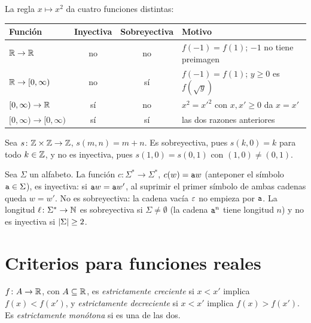 \begin{ejemplo}\label{ej:t3-cuadrado}
La regla $x\mapsto x^{2}$ da cuatro funciones distintas:
\begin{center}\small
\begin{tabular}{@{}lccl@{}}
\toprule
Función & Inyectiva & Sobreyectiva & Motivo \\
\midrule
$\mathbb{R}\to\mathbb{R}$ & no & no & $f(-1)=f(1)$; $-1$ no tiene preimagen \\
$\mathbb{R}\to[0,\infty)$ & no & sí & $f(-1)=f(1)$; $y\ge0$ es $f(\sqrt y)$ \\
$[0,\infty)\to\mathbb{R}$ & sí & no & $x^{2}=x'^{2}$ con $x,x'\ge0$ da $x=x'$ \\
$[0,\infty)\to[0,\infty)$ & sí & sí & las dos razones anteriores \\
\bottomrule
\end{tabular}
\end{center}
\end{ejemplo}

\begin{ejemplo}\label{ej:t3-suma}
Sea $s\colon\mathbb{Z}\times\mathbb{Z}\to\mathbb{Z}$, $s(m,n)=m+n$. Es sobreyectiva, pues $s(k,0)=k$ para todo $k\in\mathbb{Z}$, y no es inyectiva, pues $s(1,0)=s(0,1)$ con $(1,0)\neq(0,1)$.
\end{ejemplo}

\begin{ejemplo}\label{ej:t3-cadenas}
Sea $\Sigma$ un alfabeto. La función $c\colon\Sigma^{*}\to\Sigma^{*}$, $c(w)=\texttt{a}w$ (anteponer el símbolo $\texttt{a}\in\Sigma$), es inyectiva: si $\texttt{a}w=\texttt{a}w'$, al suprimir el primer símbolo de ambas cadenas queda $w=w'$. No es sobreyectiva: la cadena vacía $\varepsilon$ no empieza por $\texttt{a}$. La longitud $\ell\colon\Sigma^{*}\to\mathbb{N}$ es sobreyectiva si $\Sigma\neq\emptyset$ (la cadena $\texttt{a}^{n}$ tiene longitud $n$) y no es inyectiva si $\lvert\Sigma\rvert\ge2$.
\end{ejemplo}

\section{Criterios para funciones reales}

\begin{definicion}
$f\colon A\to\mathbb{R}$, con $A\subseteq\mathbb{R}$, es \emph{estrictamente creciente} si $x<x'$ implica $f(x)<f(x')$, y \emph{estrictamente decreciente} si $x<x'$ implica $f(x)>f(x')$. Es \emph{estrictamente monótona} si es una de las dos.
\end{definicion}


